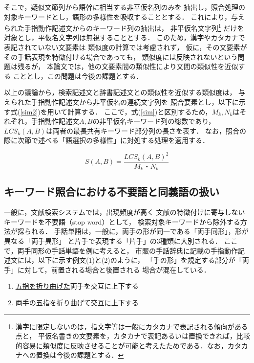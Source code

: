 そこで，疑似文節列から語幹に相当する非平仮名列のみを
抽出し，照合処理の対象キーワードとし，語形の多様性を吸収することとする．
これにより，与えられた手指動作記述文からのキーワード列の抽出は，
非平仮名文字列\footnote{漢字に限定しないのは，指文字等は一般にカタカナで表記される傾向がある点と，
平仮名書きの文要素を，カタカナで表記あるいは置換できれば，比較的容易に類似度に反映させることが可能と考えたためである．なお，カタカナへの置換は今後の課題とする．}
だけを対象とし，平仮名文字列は無視することとする．
このため，漢字やカタカナで表記されていない文要素は
類似度の計算では考慮されず，
仮に，その文要素がその手話表現を特徴付ける場合であっても，
類似度には反映されないという問題は残るが，
本論文では，他の文要素間の類似性により文間の類似性を近似する
こととし，この問題は今後の課題とする．

以上の議論から，検索記述文と辞書記述文との類似性を近似する類似度は，
与えられた手指動作記述文から非平仮名の連続文字列を
照合要素とし，以下に示す式(\ref{sim2})を用いて計算する．
ここで，式(\ref{sim})と区別するため，$M_k,N_k$はそれぞれ，手指動作記述文$A,B$の非平仮名キーワード列の総数であり，$LCS_k(A,B)$は両者の最長共有キーワード部分列の長さを表す．
なお，照合の際に次節で述べる「語選択の多様性」に対処する処理を適用する．

\begin{equation}
\label{sim2}
S(A,B) = \frac{{LCS_k(A,B)}^2}{M_k・N_k}
\end{equation}

\subsection {キーワード照合における不要語と同義語の扱い}

一般に，文献検索システムでは，出現頻度が高く
文献の特徴付けに寄与しないキーワードを不要語（stop word）として，
検索対象キーワードから除外する方法が採られる．
手話単語は，一般に，両手の形が同一である「両手同形」，形が異なる「両手異形」
と片手で表現する「片手」の3種類に大別される．
ここで，両手同形の手話単語を例に考えると，
市販の手話辞典に記載の手指動作記述文には，以下に示す例文(1)と(2)のように，
「手の形」を規定する部分が「両手」に対して，前置される場合と後置される
場合が混在している．

\begin{enumerate}
\item \underline{五指を折り曲げた}両手を交互に上下する
\item 両手\underline{の五指を折り曲げて}交互に上下する
\end{enumerate}

